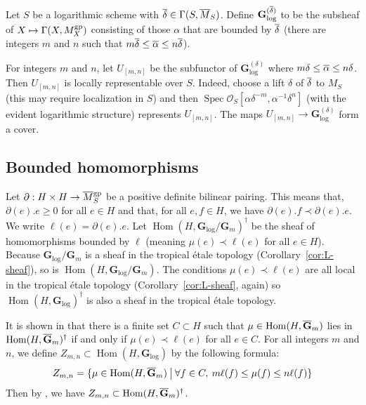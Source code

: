 \documentclass[12pt]{amsart}
\theoremstyle{definition}
\theoremstyle{remark}
\def\Hom{\operatorname{Hom}}
\def\Spec{\operatorname{Spec}}
\def\logGm{\mathbf{G}_{\log}}
\def\Gm{\mathbf{G}_m}
\def\overnorm#1{\overline{#1}\vphantom{#1}}
\def\ologGm{\overnorm{\mathbf G}_m}
\begin{document}
Let $S$ be a logarithmic scheme with $\overnorm\delta \in \Gamma(S, \overnorm M_S)$.  Define $\logGm^{(\overnorm\delta)}$ to be the subsheaf of $X \mapsto \Gamma(X, M_X^{\rm gp})$ consisting of those $\alpha$ that are bounded by $\overnorm\delta$ (there are integers $m$ and $n$ such that $m \overnorm\delta \leq \overnorm \alpha \leq n \overnorm\delta$).  

For integers $m$ and $n$, let $U_{[m,n]}$ be the subfunctor of $\logGm^{(\delta)}$ where $m \delta \leq \overnorm\alpha \leq n \delta$.  Then $U_{[m,n]}$ is locally representable over $S$.  Indeed, choose a lift $\delta$ of $\overnorm\delta$ to $M_S$ (this may require localization in $S$) and then $\Spec \mathcal O_S[\alpha \delta^{-m}, \alpha^{-1} \delta^n]$ (with the evident logarithmic structure) represents $U_{[m,n]}$.  The maps $U_{[m,n]} \to \logGm^{(\delta)}$ form a cover.

\subsection{Bounded homomorphisms}

Let $\partial : H \times H \to \overnorm M_S^{\rm gp}$ be a positive definite bilinear pairing.  This means that, $\partial(e).e \geq 0$ for all $e \in H$ and that, for all $e, f \in H$, we have $\partial(e) . f \prec \partial(e).e$.  We write $\ell(e) = \partial(e).e$.  Let $\Hom(H, \logGm/\Gm)^\dagger$ be the sheaf of homomorphisms bounded by $\ell$ (meaning $\mu(e) \prec \ell(e)$ for all $e \in H$).  Because $\logGm/\Gm$ is a sheaf in the tropical \'etale topology (Corollary~\ref{cor:L-sheaf}), so is $\Hom(H, \logGm/\Gm)$.  The conditions $\mu(e) \prec \ell(e)$ are all local in the tropical \'etale topology (Corollary~\ref{cor:L-sheaf}, again) so $\Hom(H, \logGm)^\dagger$ is also a sheaf in the tropical \'etale topology.

It is shown in \cite[Lemma~3.10.3.1]{logpic} that there is a finite set $C \subset H$ such that $\mu \in \Hom(H, \ologGm)$ lies in $\Hom(H, \ologGm)^\dagger$ if and only if $\mu(e) \prec \ell(e)$ for all $e \in C$.  For all integers $m$ and $n$, we define $Z_{m,n} \subset \Hom(H, \logGm)$ by the following formula:
\begin{equation} \label{eqn:6}
Z_{m,n} = \{ \mu \in \Hom(H, \ologGm) \: \big| \: \forall f \in C, \: m \ell(f) \leq \mu(f) \leq n \ell(f) \}
\end{equation}
Then by \cite[Lemma~3.10.3.1]{logpic}, we have $Z_{m,n} \subset \Hom(H, \ologGm)^\dagger$.
\end{document}
